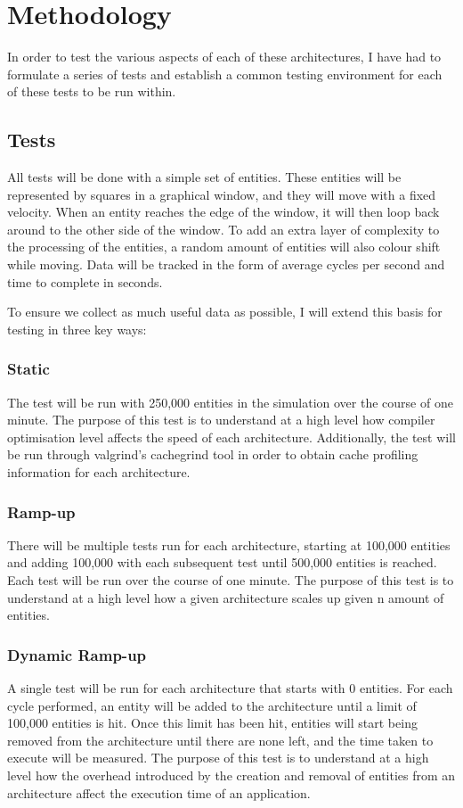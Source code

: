 \documentclass{article}
\begin{document}
\section{Methodology}
In order to test the various aspects of each of these architectures, I have had
to formulate a series of tests and establish a common testing environment for
each of these tests to be run within.

\subsection{Tests}
All tests will be done with a simple set of entities. These entities will be
represented by squares in a graphical window, and they will move with a fixed
velocity. When an entity reaches the edge of the window, it will then loop back
around to the other side of the window. To add an extra layer of complexity to
the processing of the entities, a random amount of entities will also colour
shift while moving. Data will be tracked in the form of average cycles per
second and time to complete in seconds.

To ensure we collect as much useful data as possible, I will extend this basis
for testing in three key ways:

\subsubsection{Static}
The test will be run with 250,000 entities in the simulation over the course of
one minute. The purpose of this test is to understand at a high level how
compiler optimisation level affects the speed of each architecture.
Additionally, the test will be run through valgrind's cachegrind tool in order
to obtain cache profiling information for each architecture.

\subsubsection{Ramp-up}
There will be multiple tests run for each architecture, starting at 100,000
entities and adding 100,000 with each subsequent test until 500,000 entities is
reached. Each test will be run over the course of one minute. The purpose of
this test is to understand at a high level how a given architecture scales up
given n amount of entities.

\subsubsection{Dynamic Ramp-up}
A single test will be run for each architecture that starts with 0 entities. For
each cycle performed, an entity will be added to the architecture until a limit
of 100,000 entities is hit. Once this limit has been hit, entities will start
being removed from the architecture until there are none left, and the time
taken to execute will be measured. The purpose of this test is to understand at
a high level how the overhead introduced by the creation and removal of entities
from an architecture affect the execution time of an application.
\end{document}
